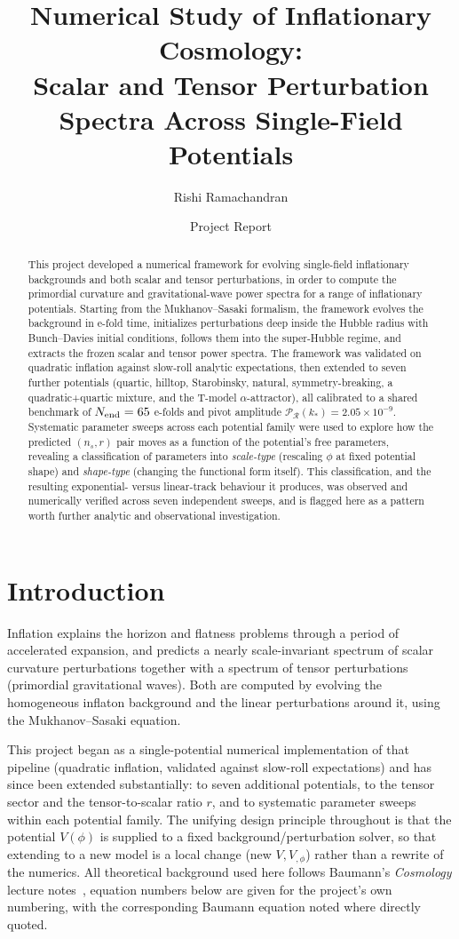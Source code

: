 \documentclass[11pt]{article}
\title{Numerical Study of Inflationary Cosmology:\\
\large Scalar and Tensor Perturbation Spectra Across Single-Field Potentials}
\author{Rishi Ramachandran}
\date{Project Report}
\begin{document}
\maketitle

\begin{abstract}
This project developed a numerical framework for evolving single-field inflationary
backgrounds and both scalar and tensor perturbations, in order to compute the primordial
curvature and gravitational-wave power spectra for a range of inflationary potentials.
Starting from the Mukhanov--Sasaki formalism, the framework evolves the background in
e-fold time, initializes perturbations deep inside the Hubble radius with Bunch--Davies
initial conditions, follows them into the super-Hubble regime, and extracts the frozen
scalar and tensor power spectra. The framework was validated on quadratic inflation
against slow-roll analytic expectations, then extended to seven further potentials
(quartic, hilltop, Starobinsky, natural, symmetry-breaking, a quadratic+quartic mixture,
and the T-model $\alpha$-attractor), all calibrated to a shared benchmark of
$N_{\rm end}=65$ e-folds and pivot amplitude $\mathcal{P}_\mathcal{R}(k_*)=2.05\times10^{-9}$.
Systematic parameter sweeps across each potential family were used to explore how the
predicted $(n_s,r)$ pair moves as a function of the potential's free parameters, revealing
a classification of parameters into \emph{scale-type} (rescaling $\phi$ at fixed potential
shape) and \emph{shape-type} (changing the functional form itself). This classification,
and the resulting exponential- versus linear-track behaviour it produces, was observed and
numerically verified across seven independent sweeps, and is flagged here as a pattern
worth further analytic and observational investigation.
\end{abstract}

\section{Introduction}
Inflation explains the horizon and flatness problems through a period of accelerated
expansion, and predicts a nearly scale-invariant spectrum of scalar curvature perturbations
together with a spectrum of tensor perturbations (primordial gravitational waves). Both are
computed by evolving the homogeneous inflaton background and the linear perturbations
around it, using the Mukhanov--Sasaki equation.

This project began as a single-potential numerical implementation of that pipeline
(quadratic inflation, validated against slow-roll expectations) and has since been
extended substantially: to seven additional potentials, to the tensor sector and the
tensor-to-scalar ratio $r$, and to systematic parameter sweeps within each potential
family. The unifying design principle throughout is that the potential $V(\phi)$ is
supplied to a fixed background/perturbation solver, so that extending to a new model is a
local change (new $V,V_{,\phi}$) rather than a rewrite of the numerics. All theoretical
background used here follows Baumann's \emph{Cosmology} lecture notes~\cite{baumann},
equation numbers below are given for the
project's own numbering, with the corresponding Baumann equation noted where directly
quoted.
\end{document}
